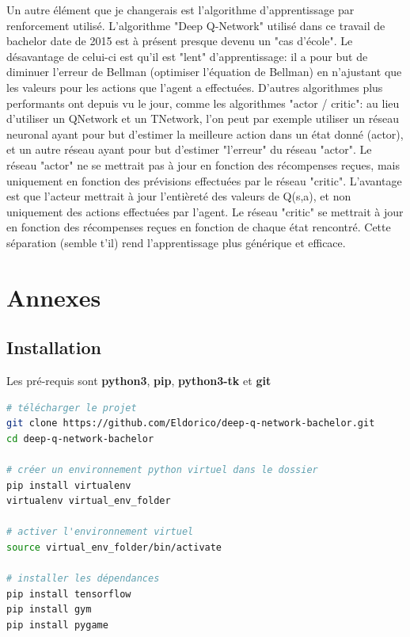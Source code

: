 \documentclass[11pt,a4paper]{report}
\begin{document}
  \par Un autre élément que je changerais est l'algorithme d'apprentissage par renforcement utilisé. L'algorithme "Deep Q-Network" utilisé dans ce travail de bachelor date de 2015 est à présent presque devenu un "cas d'école". Le désavantage de celui-ci est qu'il est "lent" d'apprentissage: il a pour but de diminuer l'erreur de Bellman (optimiser l'équation de Bellman) en n'ajustant que les valeurs pour les actions que l'agent a effectuées. D'autres algorithmes plus performants ont depuis vu le jour, comme les algorithmes "actor / critic": au lieu d'utiliser un QNetwork et un TNetwork, l'on peut par exemple utiliser un réseau neuronal ayant pour but d'estimer la meilleure action dans un état donné (actor), et un autre réseau ayant pour but d'estimer "l'erreur" du réseau "actor". Le réseau "actor" ne se mettrait pas à jour en fonction des récompenses reçues, mais uniquement en fonction des prévisions effectuées par le réseau "critic". L'avantage est que l'acteur mettrait à jour l’entièreté des valeurs de Q(s,a), et non uniquement des actions effectuées par l'agent. Le réseau "critic" se mettrait à jour en fonction des récompenses reçues en fonction de chaque état rencontré. Cette séparation (semble t'il) rend l'apprentissage plus générique et efficace. 
  
  \chapter{Annexes}
  
  \section{Installation}
  
  \par Les pré-requis sont \textbf{python3}, \textbf{pip}, \textbf{python3-tk} et \textbf{git}
  
  \begin{lstlisting}[language=bash]
# télécharger le projet
git clone https://github.com/Eldorico/deep-q-network-bachelor.git
cd deep-q-network-bachelor

# créer un environnement python virtuel dans le dossier
pip install virtualenv
virtualenv virtual_env_folder

# activer l'environnement virtuel
source virtual_env_folder/bin/activate

# installer les dépendances
pip install tensorflow
pip install gym
pip install pygame
  \end{lstlisting}  
  
\end{document}
